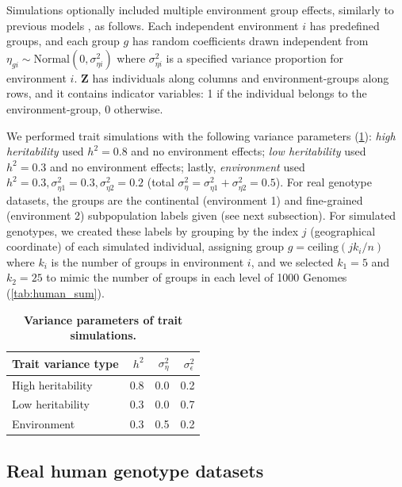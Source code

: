 \documentclass[11pt]{article}
\begin{document}
\begin{linenumbers}
Simulations optionally included multiple environment group effects, similarly to previous models \citep{zhang_principal_2015, wang_trade-offs_2022}, as follows.
Each independent environment $i$ has predefined groups, and each group $g$ has random coefficients drawn independent from $\eta_{gi} \sim \text{Normal}( 0, \sigma^2_{\eta i} )$ where $\sigma^2_{\eta i}$ is a specified variance proportion for environment $i$.
$\mathbf{Z}$ has individuals along columns and environment-groups along rows, and it contains indicator variables: 1 if the individual belongs to the environment-group, 0 otherwise.

We performed trait simulations with the following variance parameters (\cref{tab:trait-var-sim}):
\textit{high heritability} used $h^2 = 0.8$ and no environment effects;
\textit{low heritability} used $h^2 = 0.3$ and no environment effects;
lastly,
\textit{environment} used $h^2 = 0.3, \sigma^2_{\eta 1} = 0.3, \sigma^2_{\eta 2} = 0.2$ (total $\sigma^2_\eta = \sigma^2_{\eta 1} + \sigma^2_{\eta 2} = 0.5$).
For real genotype datasets, the groups are the continental (environment 1) and fine-grained (environment 2) subpopulation labels given (see next subsection).
For simulated genotypes, we created these labels by grouping by the index $j$ (geographical coordinate) of each simulated individual, assigning group $g = \text{ceiling}( j k_i / n )$ where $k_i$ is the number of groups in environment $i$, and we selected $k_1 = 5$ and $k_2 = 25$ to mimic the number of groups in each level of 1000 Genomes (\cref{tab:human_sum}).

\begin{table}[b!]
  \centering
  \caption{
    \textbf{Variance parameters of trait simulations.}
  }
  \label{tab:trait-var-sim}
  \begin{tabular}{lrrr}
    \toprule
    Trait variance type & $h^2$ & $\sigma^2_\eta$ & $\sigma^2_\epsilon$ \\
    \midrule
    High heritability & 0.8 & 0.0 & 0.2 \\
    Low heritability  & 0.3 & 0.0 & 0.7 \\
    Environment       & 0.3 & 0.5 & 0.2 \\
    \bottomrule
  \end{tabular}
\end{table}

\subsection{Real human genotype datasets}


\end{linenumbers}
\end{document}
